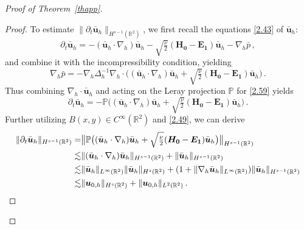\documentclass[pdflatex,sn-mathphys-num]{sn-jnl}%
\theoremstyle{thmstyleone}%
\theoremstyle{thmstyletwo}%
\theoremstyle{thmstylethree}%
\theoremstyle{thmstyletwo}
\begin{document}
\begin{proof}[Proof of Theorem~{\upshape\ref{thapp}}]
\begin{proof}
	
	To estimate $\lVert\partial_t \bar{\boldsymbol{u}}_h\rVert_{H^{s-1}(\mathbb{R}^2)}$, we first recall the equations \eqref{2.43} of $\bar{\boldsymbol{u}}_h$:
	\begin{equation}\label{2.59}
		\partial_{t} \bar{\boldsymbol{u}}_h
		=-(\bar {\boldsymbol u}_h \cdot \nabla_h) \bar {\boldsymbol u}_h
		-\sqrt{\tfrac{\nu}{2}}
		(\boldsymbol{H_0}
		-\boldsymbol{E_1})
		\bar{\boldsymbol u}_h-\nabla_h\bar p\,,
	\end{equation}
	and combine it with the incompressibility condition, yielding 
	\begin{equation*}
		\nabla_h\bar p=-\nabla_h\Delta_h^{-1}\nabla_h\cdot\Big((\bar {\boldsymbol u}_h \cdot \nabla_h) \bar {\boldsymbol u}_h+\sqrt{\tfrac{\nu}{2}}
		(\boldsymbol{H_0}
		-\boldsymbol{E_1})
		\bar{\boldsymbol u}_h\Big)\,.
	\end{equation*}
	Thus combining $\nabla_h \cdot \bar{\boldsymbol{u}}_h$ and acting on the Leray projection  $\mathbb{P}$ for \eqref{2.59} yields
	\begin{equation}\label{2.60}
		\partial_{t} \bar{\boldsymbol{u}}_h
		=-\mathbb{P}\big(
		(\bar {\boldsymbol u}_h \cdot \nabla_h) \bar {\boldsymbol u}_h+\sqrt{\tfrac{\nu}{2}}
		(\boldsymbol{H_0}
		-\boldsymbol{E_1})
		\bar{\boldsymbol u}_h
		\big)\,.
	\end{equation}
	Further utilizing $B(x,y)\in C^\infty(\mathbb{R}^2)$ and \eqref{2.49}, we can derive
	\begin{align*}
		\lVert\partial_t\bar{\boldsymbol{u}}_h\rVert_{{H}^{s-1}(\mathbb{R}^2)}
		=
		&\big\lVert
		\mathbb{P}\big(
		(\bar {\boldsymbol u}_h \cdot \nabla_h) \bar {\boldsymbol u}_h+\sqrt{\tfrac{\nu}{2}}
		(\boldsymbol{H_0}
		-\boldsymbol{E_1})
		\bar{\boldsymbol u}_h
		\big)
		\big\rVert_{{H}^{s-1}(\mathbb{R}^2)}\notag\\
		\lesssim&
		\lVert(\bar {\boldsymbol u}_h \cdot \nabla_h) \bar {\boldsymbol u}_h\rVert_{{H}^{s-1}(\mathbb{R}^2)}
		+
		\lVert\bar {\boldsymbol u}_h\rVert_{{H}^{s-1}(\mathbb{R}^2)}
		\notag\\
		\lesssim&\lVert\bar{\boldsymbol{u}}_h\rVert_{{L}^\infty(\mathbb{R}^2)}
		\lVert\bar {\boldsymbol u}_h\rVert_{{H}^{s}(\mathbb{R}^2)}
		+
		(1+\lVert\nabla_{ h}\bar{\boldsymbol{u}}_h\rVert_{{L}^\infty(\mathbb{R}^2)})
		\lVert\bar {\boldsymbol u}_h\rVert_{{H}^{s-1}(\mathbb{R}^2)}\notag\\
		\lesssim &\lVert
		 {\boldsymbol u}_{0,h}\rVert_{H^{s}(\mathbb{R}^2)}
		+\lVert{\boldsymbol{u}}_{0,h}\rVert_{L^2(\mathbb{R}^2)}\,.
		\notag
	\end{align*}	
\end{proof}
%
%
%


\end{proof}
\end{document}
